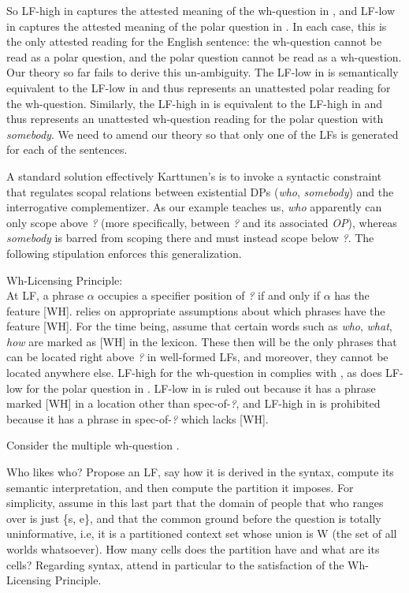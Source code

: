 So LF-high in  captures the attested meaning of the
wh-question in , and LF-low in 
captures the attested meaning of the polar question in . In
each case, this is the only attested reading for the English sentence: the
wh-question cannot be read as a polar question, and the polar question cannot be
read as a wh-question. Our theory so far fails to derive this un-ambiguity. The
LF-low in  is semantically equivalent to the LF-low in
 and thus represents an unattested polar reading
for the wh-question. Similarly, the LF-high in  is
equivalent to the LF-high in  and thus represents an
unattested wh-question reading for the polar question with \emph{somebody}. We
need to amend our theory so that only one of the LFs is generated for each of
the sentences.

A standard solution \dash effectively Karttunen's \dash is to invoke a syntactic
constraint that regulates scopal relations between existential DPs (\emph{who},
\emph{somebody}) and the interrogative complementizer. As our example teaches
us, \emph{who} apparently can only scope above \emph{?} (more specifically,
between \emph{?} and its associated \emph{OP}), whereas \emph{somebody} is
barred from scoping there and must instead scope below \emph{?}. The following
stipulation enforces this generalization.

\ex Wh-Licensing Principle:\\
At LF, a phrase $\alpha$ occupies a specifier position of \emph{?} if and only
if $\alpha$ has the feature [WH].
\xe
%
\Last relies on appropriate assumptions about which phrases have the feature
[WH]. For the time being, assume that certain words such as \emph{who},
\emph{what}, \emph{how} are marked as [WH] in the lexicon. These then will be
the only phrases that can be located right above \emph{?} in well-formed LFs,
and moreover, they cannot be located anywhere else. LF-high for the wh-question
in  complies with \Last, as does LF-low for the polar
question in . LF-low in 
is ruled out because it has a phrase marked [WH] in a location other than
spec-of-\emph{?}, and LF-high in  is prohibited
because it has a phrase in spec-of-\emph{?} which lacks [WH].

\begin{exercise}
  Consider the multiple wh-question \Next.

  \ex Who likes who? \xe
%
  Propose an LF, say how it is derived in the syntax, compute its semantic
  interpretation, and then compute the partition it imposes. For simplicity,
  assume in this last part that the domain of people that who ranges over is
  just \{s, e\}, and that the common ground before the question is totally
  uninformative, i.e, it is a partitioned context set whose union is W (the set
  of all worlds whatsoever). How many cells does the partition have and what are
  its cells? Regarding syntax, attend in particular to the satisfaction of the
  Wh-Licensing Principle.
\end{exercise}

